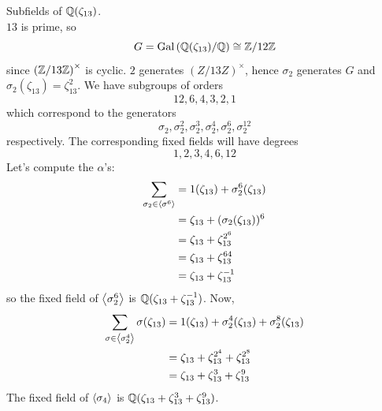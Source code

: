 \begin{example}
    Subfields of $\mathbb{Q}(\zeta_{13})$. \\
    $13$ is prime, so 
    \[G = \text{Gal}\left(\mathbb{Q}(\zeta_{13})/\mathbb{Q}\right) \cong \mathbb{Z}/12\mathbb{Z}\]
    since $\left(\mathbb{Z}/13\mathbb{Z}\right)^\times$ is cyclic. $2$ generates $\left(Z/13Z\right)^\times$, hence $\sigma_2$ generates $G$ and $\sigma_2(\zeta_{13}) = \zeta_{13}^2.$ We have subgroups of orders \[12, 6, 4, 3, 2, 1\] which correspond to the generators
    \[\sigma_2, \sigma_2^2, \sigma_2^3, \sigma_2^4, \sigma_2^6, \sigma_2^{12}\]
    respectively. The corresponding fixed fields will have degrees
    \[1, 2, 3, 4, 6, 12 \tag{index of the subgroups of $G$}\]
    Let's compute the $\alpha$'s:
    \begin{align*}
        \sum_{\sigma_2 \in \left\langle \sigma^6 \right\rangle} &= 1(\zeta_{13}) + \sigma_2^6(\zeta_{13}) \\ 
        &= \zeta_{13} + (\sigma_2(\zeta_{13}))^6 \\
        &= \zeta_{13} + \zeta_{13}^{2^6} \\ 
        &= \zeta_{13} + \zeta_{13}^{64} \\ 
        &= \zeta_{13} + \zeta_{13}^{-1}
    \end{align*}
    so the fixed field of $\left\langle \sigma_2^6 \right\rangle$ is $\mathbb{Q}(\zeta_{13} + \zeta_{13}^{-1})$. Now,
    \begin{align*}
        \sum_{\sigma\in \left\langle \sigma_2^4 \right\rangle}\sigma(\zeta_{13}) &= 1(\zeta_{13}) + \sigma_2^4(\zeta_{13})+\sigma_2^8 (\zeta_{13}) \\ 
        &= \zeta_{13} + \zeta_{13}^{2^4} + \zeta_{13}^{2^8} \\ 
        &= \zeta_{13} + \zeta_{13}^3 + \zeta_{13}^9
    \end{align*}
    The fixed field of $\left\langle \sigma_4 \right\rangle$ is $\mathbb{Q}(\zeta_{13} + \zeta_{13}^3 + \zeta_{13}^9)$.
\end{example}